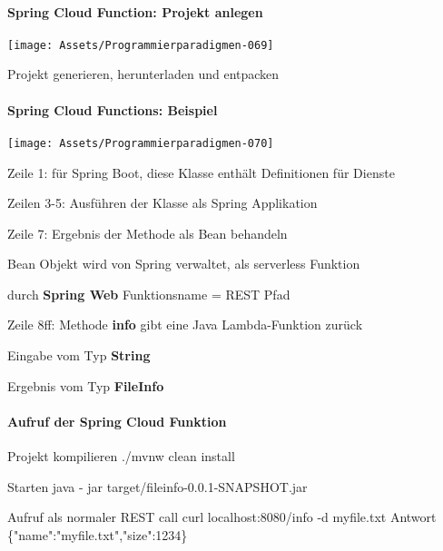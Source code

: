 \documentclass[10pt]{article}
\begin{document}
\paragraph{Spring Cloud Function: Projekt anlegen}
\begin{center}
  \centering
  \texttt{[image: Assets/Programmierparadigmen-069]}
\end{center}
Projekt generieren, herunterladen und entpacken

\paragraph{Spring Cloud Functions: Beispiel}
\begin{center}
  \centering
  \texttt{[image: Assets/Programmierparadigmen-070]}
\end{center}
\begin{itemize*}
  \item Zeile 1: für Spring Boot, diese Klasse enthält Definitionen für Dienste
  \item Zeilen 3-5: Ausführen der Klasse als Spring Applikation
  \item Zeile 7: Ergebnis der Methode als Bean behandeln
  \begin{itemize*}
    \item Bean Objekt wird von Spring verwaltet, als serverless Funktion
    \item durch \textbf{Spring Web} Funktionsname = REST Pfad
  \end{itemize*}
  \item Zeile 8ff: Methode \textbf{info} gibt eine Java Lambda-Funktion zurück
  \begin{itemize*}
    \item Eingabe vom Typ \textbf{String}
    \item Ergebnis vom Typ \textbf{FileInfo}
  \end{itemize*}
\end{itemize*}

\paragraph{Aufruf der Spring Cloud Funktion}
\begin{enumerate*}
  \item Projekt kompilieren \newline ./mvnw clean install
  \item Starten \newline
  java - jar target/fileinfo-0.0.1-SNAPSHOT.jar
  \item Aufruf als normaler REST call
  \newline curl localhost:8080/info -d myfile.txt
  \newline Antwort
  \newline \{"name":"myfile.txt","size":1234\}
\end{enumerate*}
\end{document}
